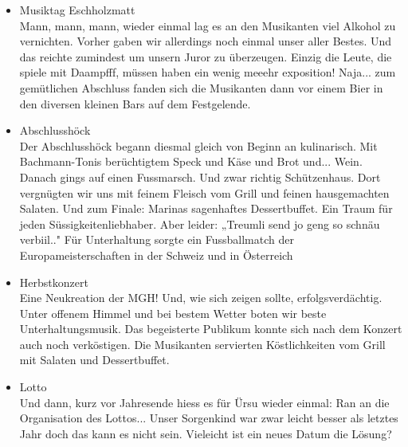\begin{history}
\begin{itemize}
        \item[]Musiktag Eschholzmatt\\
        Mann, mann, mann, wieder einmal lag es an den Musikanten viel Alkohol zu
        vernichten. Vorher gaben wir allerdings noch einmal unser aller Bestes.
        Und das reichte zumindest um unsern Juror zu überzeugen. Einzig die
        Leute, die spiele mit Daampfff, müssen haben ein wenig meeehr
        exposition! Naja... zum gemütlichen Abschluss fanden sich die Musikanten
        dann vor einem Bier in den diversen kleinen Bars auf dem Festgelende.

        \item[]Abschlusshöck\\
        Der Abschlusshöck begann diesmal gleich von Beginn an kulinarisch. Mit
        Bachmann-Tonis berüchtigtem Speck und Käse und Brot und... Wein. Danach
        gings auf einen Fussmarsch. Und zwar richtig Schützenhaus. Dort
        vergnügten wir uns mit feinem Fleisch vom Grill und feinen hausgemachten
        Salaten. Und zum Finale: Marinas sagenhaftes Dessertbuffet. Ein Traum
        für jeden Süssigkeitenliebhaber. Aber leider: „Treumli send jo geng so
        schnäu verbiil.." Für Unterhaltung sorgte ein Fussballmatch der
        Europameisterschaften in der Schweiz und in Österreich



        \item[]Herbstkonzert\\
        Eine Neukreation der MGH! Und, wie sich zeigen sollte,
        erfolgsverdächtig. Unter offenem Himmel und bei bestem Wetter boten wir
        beste Unterhaltungsmusik. Das begeisterte Publikum konnte sich nach dem
        Konzert auch noch verköstigen. Die Musikanten servierten Köstlichkeiten
        vom Grill mit Salaten und Dessertbuffet.

        \item[]Lotto\\
        Und dann, kurz vor Jahresende hiess es für Ürsu wieder einmal: Ran an
        die Organisation des Lottos... Unser Sorgenkind war zwar leicht besser
        als letztes Jahr doch das kann es nicht sein. Vieleicht ist ein neues
        Datum die Lösung?


    \end{itemize}

\end{history}
